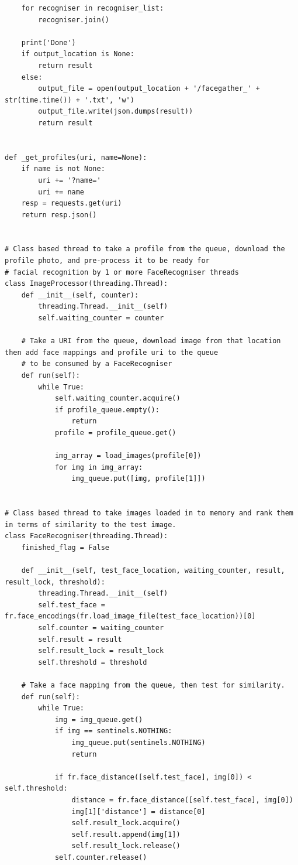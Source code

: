 \documentclass[12pt]{article}
\begin{document}
\begin{appendices}
\begin{lstlisting}
    for recogniser in recogniser_list:
        recogniser.join()

    print('Done')
    if output_location is None:
        return result
    else:
        output_file = open(output_location + '/facegather_' + str(time.time()) + '.txt', 'w')
        output_file.write(json.dumps(result))
        return result


def _get_profiles(uri, name=None):
    if name is not None:
        uri += '?name='
        uri += name
    resp = requests.get(uri)
    return resp.json()


# Class based thread to take a profile from the queue, download the profile photo, and pre-process it to be ready for
# facial recognition by 1 or more FaceRecogniser threads
class ImageProcessor(threading.Thread):
    def __init__(self, counter):
        threading.Thread.__init__(self)
        self.waiting_counter = counter

    # Take a URI from the queue, download image from that location then add face mappings and profile uri to the queue
    # to be consumed by a FaceRecogniser
    def run(self):
        while True:
            self.waiting_counter.acquire()
            if profile_queue.empty():
                return
            profile = profile_queue.get()

            img_array = load_images(profile[0])
            for img in img_array:
                img_queue.put([img, profile[1]])


# Class based thread to take images loaded in to memory and rank them in terms of similarity to the test image.
class FaceRecogniser(threading.Thread):
    finished_flag = False

    def __init__(self, test_face_location, waiting_counter, result, result_lock, threshold):
        threading.Thread.__init__(self)
        self.test_face = fr.face_encodings(fr.load_image_file(test_face_location))[0]
        self.counter = waiting_counter
        self.result = result
        self.result_lock = result_lock
        self.threshold = threshold

    # Take a face mapping from the queue, then test for similarity.
    def run(self):
        while True:
            img = img_queue.get()
            if img == sentinels.NOTHING:
                img_queue.put(sentinels.NOTHING)
                return

            if fr.face_distance([self.test_face], img[0]) < self.threshold:
                distance = fr.face_distance([self.test_face], img[0])
                img[1]['distance'] = distance[0]
                self.result_lock.acquire()
                self.result.append(img[1])
                self.result_lock.release()
            self.counter.release()


\end{lstlisting}
\end{appendices}
\end{document}
